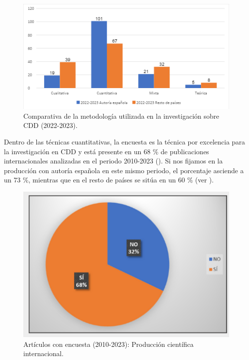 \documentclass[spanish]{textolivre}
\begin{document}
\begin{figure}[h!]
    \centering
    \begin{minipage}{.8\textwidth}
    \includegraphics[width=\linewidth]{images/image5.png}
    \caption{Comparativa de la metodología utilizada en la investigación sobre CDD (2022-2023).}
    \label{fig-5}
    \end{minipage}
\end{figure}

Dentro de las técnicas cuantitativas, la encuesta es la técnica por excelencia para la investigación en CDD y está presente en un 68 \% de publicaciones internacionales analizadas en el periodo 2010-2023 (). Si nos fijamos en la producción con autoría española en este mismo periodo, el porcentaje asciende a un 73 \%, mientras que en el resto de países se sitúa en un 60 \% (ver ).

\begin{figure}[H]
    \centering
    \begin{minipage}{.5\textwidth}
    \includegraphics[width=\linewidth]{images/IMAGE6.png}
    \caption{Artículos con encuesta (2010-2023): Producción científica internacional.}
    \label{fig-6}
    \end{minipage}
\end{figure}
\end{document}
